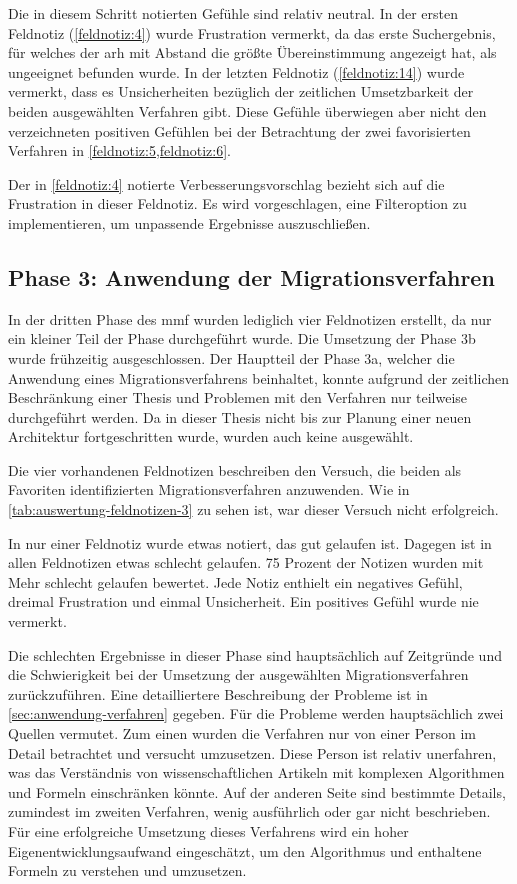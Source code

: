 Die in diesem Schritt notierten Gefühle sind relativ neutral.
In der ersten Feldnotiz (\cref{feldnotiz:4}) wurde Frustration vermerkt, da das erste Suchergebnis, für welches der \gls{arh} mit Abstand die größte Übereinstimmung angezeigt hat, als ungeeignet befunden wurde.
In der letzten Feldnotiz (\cref{feldnotiz:14}) wurde vermerkt, dass es Unsicherheiten bezüglich der zeitlichen Umsetzbarkeit der beiden ausgewählten Verfahren gibt.
Diese Gefühle überwiegen aber nicht den verzeichneten positiven Gefühlen bei der Betrachtung der zwei favorisierten Verfahren in \cref{feldnotiz:5,feldnotiz:6}.

Der in \cref{feldnotiz:4} notierte Verbesserungsvorschlag bezieht sich auf die Frustration in dieser Feldnotiz.
Es wird vorgeschlagen, eine Filteroption zu implementieren, um unpassende Ergebnisse auszuschließen.

\subsection{Phase 3: Anwendung der Migrationsverfahren}
\label{sec:feldnotizen-auswertung-phase3}

In der dritten Phase des \gls{mmf} wurden lediglich vier Feldnotizen erstellt, da nur ein kleiner Teil der Phase durchgeführt wurde.
Die Umsetzung der Phase 3b wurde frühzeitig ausgeschlossen.
Der Hauptteil der Phase 3a, welcher die Anwendung eines Migrationsverfahrens beinhaltet, konnte aufgrund der zeitlichen Beschränkung einer Thesis und Problemen mit den Verfahren nur teilweise durchgeführt werden.
Da in dieser Thesis nicht bis zur Planung einer neuen Architektur fortgeschritten wurde, wurden auch keine \bpp ausgewählt.

Die vier vorhandenen Feldnotizen beschreiben den Versuch, die beiden als Favoriten identifizierten Migrationsverfahren anzuwenden.
Wie in \cref{tab:auswertung-feldnotizen-3} zu sehen ist, war dieser Versuch nicht erfolgreich.

In nur einer Feldnotiz wurde etwas notiert, das gut gelaufen ist.
Dagegen ist in allen Feldnotizen etwas schlecht gelaufen.
75 Prozent der Notizen wurden mit \glqq Mehr schlecht gelaufen\grqq{} bewertet.
Jede Notiz enthielt ein negatives Gefühl, dreimal Frustration und einmal Unsicherheit.
Ein positives Gefühl wurde nie vermerkt.

Die schlechten Ergebnisse in dieser Phase sind hauptsächlich auf Zeitgründe und die Schwierigkeit bei der Umsetzung der ausgewählten Migrationsverfahren zurückzuführen.
Eine detailliertere Beschreibung der Probleme ist in \cref{sec:anwendung-verfahren} gegeben.
Für die Probleme werden hauptsächlich zwei Quellen vermutet.
Zum einen wurden die Verfahren nur von einer Person im Detail betrachtet und versucht umzusetzen.
Diese Person ist relativ unerfahren, was das Verständnis von wissenschaftlichen Artikeln mit komplexen Algorithmen und Formeln einschränken könnte.
Auf der anderen Seite sind bestimmte Details, zumindest im zweiten Verfahren, wenig ausführlich oder gar nicht beschrieben.
Für eine erfolgreiche Umsetzung dieses Verfahrens wird ein hoher Eigenentwicklungsaufwand eingeschätzt, um den Algorithmus und enthaltene Formeln zu verstehen und umzusetzen.


